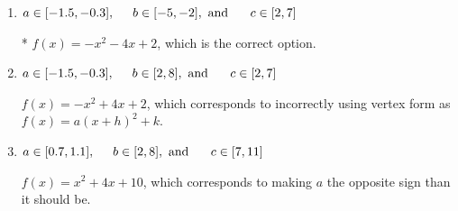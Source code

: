 \documentclass{extbook}[14pt]
\begin{document}
\begin{enumerate}
{\begin{enumerate}[label=\Alph*.]
$f(x)=-x^{2} +4 x -10$, which corresponds to incorrectly using vertex form as $f(x) = a(x+h)^2 - k$.
\item \( a \in [-1.5, -0.3], \hspace*{5mm} b \in [-5, -2], \text{ and } \hspace*{5mm} c \in [2, 7] \)

* $f(x)=-x^{2} -4 x + 2$, which is the correct option.
\item \( a \in [-1.5, -0.3], \hspace*{5mm} b \in [2, 8], \text{ and } \hspace*{5mm} c \in [2, 7] \)

$f(x)=-x^{2} +4 x + 2$, which corresponds to incorrectly using vertex form as $f(x) = a(x+h)^2+k$.
\item \( a \in [0.7, 1.1], \hspace*{5mm} b \in [2, 8], \text{ and } \hspace*{5mm} c \in [7, 11] \)

$f(x)=x^{2} +4 x + 10$, which corresponds to making $a$ the opposite sign than it should be.
\end{enumerate}

}
\end{enumerate}
\end{document}
